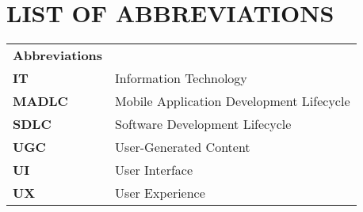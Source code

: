 \chapter{LIST OF ABBREVIATIONS}

\par\noindent
\vspace{2cm}
\begin{tabular}{@{}p{30mm}l@{}}
\textbf{Abbreviations}  & \\
\textbf{IT}                     & Information Technology \\
\textbf{MADLC}                  & Mobile Application Development Lifecycle \\
\textbf{SDLC}                   & Software Development Lifecycle \\
\textbf{UGC}                    & User-Generated Content \\
\textbf{UI}                     & User Interface \\
\textbf{UX}                     & User Experience
\end{tabular}


